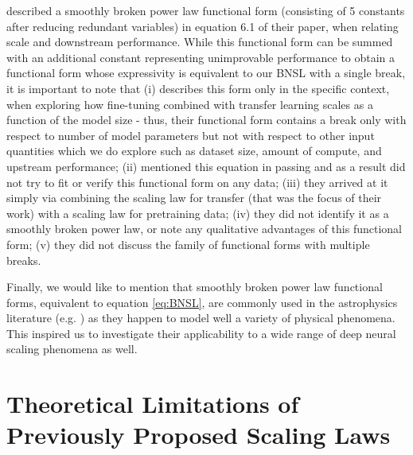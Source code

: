 \documentclass{article} %
\begin{document}
\citet{2021arXiv210201293H} described a smoothly broken power law functional form (consisting of 5 constants after reducing redundant variables) in equation 6.1 of their paper, when relating scale and downstream performance. 
While this functional form can be summed with an additional constant representing unimprovable performance to obtain a functional form whose expressivity is equivalent to our BNSL with a single break, it is important to note that (i) \citet{2021arXiv210201293H} describes this form  only in the specific context, when exploring how  fine-tuning combined with transfer learning scales as a function of the model size - thus, their functional form contains a break only with respect to number of model parameters but not with respect to other input quantities which we do explore such as dataset size, amount of compute, and upstream performance; (ii) \citet{2021arXiv210201293H} mentioned this equation in passing and as a result did not try to fit or verify this functional form on any data; (iii) they arrived at it simply via combining the scaling law for transfer (that was the focus of their work) with a scaling law for pretraining data; (iv) they did not identify it as a smoothly broken power law, or note any qualitative advantages of this functional form; (v) they did not discuss the family of functional forms with multiple breaks. 

\vspace{-1.2mm}

Finally, we would like to mention that smoothly broken power law functional forms, equivalent to equation \ref{eq:BNSL}, are commonly used in the astrophysics literature (e.g. \cite{dampe2017direct}) as they happen  to  model well a variety of physical phenomena. This inspired us to investigate their applicability to a wide range of deep neural scaling phenomena as well.





%
\section{Theoretical Limitations of Previously Proposed Scaling Laws}
\label{section:math_proofs}
\end{document}
